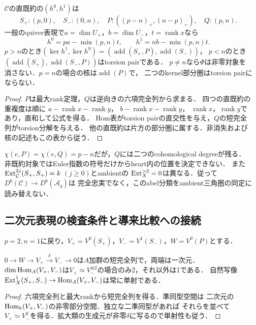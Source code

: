 \begin{corollary}
\label{cor:a2-torsion-pair}
$\mathcal C$の直既約の$(h^0,h^1)$は
\[
S_+:(p,0),\quad S_-:(0,n),\quad P:((p-n)_+,(n-p)_+),\quad Q:(p,n).
\]
一般のquiver表現で$a=\dim U_+$，$b=\dim U_-$，$t=\operatorname{rank}x$なら
\[
h^0=pa-\min(p,n)t,\qquad h^1=nb-\min(p,n)t.
\]
$p>n$のとき$(\ker h^1,\ker h^0)=(\operatorname{add}(S_+,P),\operatorname{add}(S_-))$，
$p<n$のとき$(\operatorname{add}(S_+),\operatorname{add}(S_-,P))$はtorsion pairである．
$p\ne n$なら$\Phi$は非零対象を消さない．$p=n$の場合の核は$\operatorname{add}(P)$で，
二つのkernel部分圏はtorsion pairにならない．
\end{corollary}
\begin{proof}
$P$は最大rank定理，$Q$は逆向きの六項完全列から求まる．
四つの直既約の重複度は順に
$a-\operatorname{rank}x-\operatorname{rank}y$，
$b-\operatorname{rank}x-\operatorname{rank}y$，
$\operatorname{rank}x$，$\operatorname{rank}y$であり，直和して公式を得る．
Hom表がtorsion pairの直交性を与え，$Q$の短完全列がtorsion分解を与える．
他の直既約は片方の部分圏に属する．非消失および核の記述もこの表から従う．
\end{proof}
\begin{remark}
$\chi(e,P)=\chi(e,Q)=p-n$だが，$Q$には二つのcohomological degreeが残る．
非既約対象ではEuler指数の符号だけからheart内の位置を決定できない．
また$\operatorname{Ext}_{\mathcal C}^{2j}(S_+,S_+)=k$ $(j\ge0)$とambientの
$\operatorname{Ext}_X^{>2}=0$は異なる．従って$D^b(\mathcal C)\to D^b(\mathcal A_q)$は
完全忠実でなく，このabel分類をambient三角圏の同定に読み替えない．
\end{remark}

\subsection{二次元表現の検査条件と導来比較への接続}
$p=2,n=1$に戻り，$V_+=V^0(S_+)$，$V_-=V^1(S_-)$，$W=V^0(P)$とする．
\begin{proposition}[単一Homテストの正確な範囲]
\label{prop:a2-scalar-test}
$0\to W\to V_+\xrightarrow{\delta}V_-\to0$は$A$加群の短完全列で，両端は一次元．
$\dim\operatorname{Hom}_A(V_+,V_-)$は$V_+\simeq V_-^{\oplus2}$の場合のみ2，それ以外は1である．
自然写像$\operatorname{Ext}_X^1(S_+,S_-)\to\operatorname{Hom}_A(V_+,V_-)$は常に単射である．
\end{proposition}
\begin{proof}
六項完全列と最大rankから短完全列を得る．準同型空間は
二次元の$\operatorname{Hom}_k(V_+,V_-)$の非零部分空間．独立な二準同型があれば
それらを並べて$V_+\simeq V_-^2$を得る．拡大類の生成元が非零$\delta$に写るので単射性も従う．
\end{proof}

